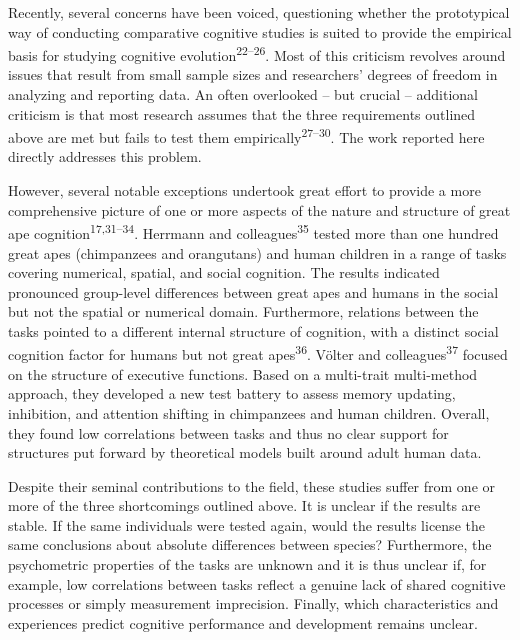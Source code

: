 \documentclass[
  man,floatsintext]{apa6}
\begin{document}
Recently, several concerns have been voiced, questioning whether the prototypical way of conducting comparative cognitive studies is suited to provide the empirical basis for studying cognitive evolution\textsuperscript{22--26}. Most of this criticism revolves around issues that result from small sample sizes and researchers' degrees of freedom in analyzing and reporting data. An often overlooked -- but crucial -- additional criticism is that most research assumes that the three requirements outlined above are met but fails to test them empirically\textsuperscript{27--30}. The work reported here directly addresses this problem.

However, several notable exceptions undertook great effort to provide a more comprehensive picture of one or more aspects of the nature and structure of great ape cognition\textsuperscript{17,31--34}. Herrmann and colleagues\textsuperscript{35} tested more than one hundred great apes (chimpanzees and orangutans) and human children in a range of tasks covering numerical, spatial, and social cognition. The results indicated pronounced group-level differences between great apes and humans in the social but not the spatial or numerical domain. Furthermore, relations between the tasks pointed to a different internal structure of cognition, with a distinct social cognition factor for humans but not great apes\textsuperscript{36}. Völter and colleagues\textsuperscript{37} focused on the structure of executive functions. Based on a multi-trait multi-method approach, they developed a new test battery to assess memory updating, inhibition, and attention shifting in chimpanzees and human children. Overall, they found low correlations between tasks and thus no clear support for structures put forward by theoretical models built around adult human data.

Despite their seminal contributions to the field, these studies suffer from one or more of the three shortcomings outlined above. It is unclear if the results are stable. If the same individuals were tested again, would the results license the same conclusions about absolute differences between species? Furthermore, the psychometric properties of the tasks are unknown and it is thus unclear if, for example, low correlations between tasks reflect a genuine lack of shared cognitive processes or simply measurement imprecision. Finally, which characteristics and experiences predict cognitive performance and development remains unclear.
\end{document}
